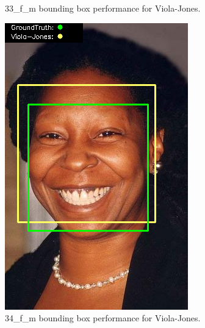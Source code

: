 \documentclass{l4proj}
\begin{document}
\begin{appendices}
\begin{figure}[h!]
\begin{minipage}{0.49\textwidth}
    \caption{33\_f\_m bounding box performance for Viola-Jones.}
    \label{whoopi_result}
  \end{minipage}
\end{figure}

\begin{figure}[h!]
  \centering
  \begin{minipage}{0.49\textwidth}
    \centering
     \includegraphics[width=\textwidth]{images/appendix/viola/34.png}
    \caption{34\_f\_m bounding box performance for Viola-Jones.}
    \label{whoopi_result}
  \end{minipage}
    \hfill
    \begin{minipage}{0.49\textwidth}
    \centering

\end{minipage}
\end{figure}
\end{appendices}
\end{document}
